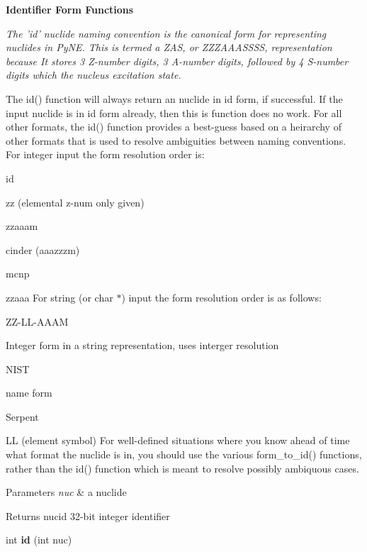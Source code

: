 \begin{Indent}{\bf Identifier Form Functions}\par
{\em The 'id' nuclide naming convention is the canonical form for representing nuclides in Py\+N\+E. This is termed a Z\+A\+S, or Z\+Z\+Z\+A\+A\+A\+S\+S\+S\+S, representation because It stores 3 Z-\/number digits, 3 A-\/number digits, followed by 4 S-\/number digits which the nucleus excitation state.

The id() function will always return an nuclide in id form, if successful. If the input nuclide is in id form already, then this is function does no work. For all other formats, the id() function provides a best-\/guess based on a heirarchy of other formats that is used to resolve ambiguities between naming conventions. For integer input the form resolution order is\+:
\begin{DoxyItemize}
\item id
\item zz (elemental z-\/num only given)
\item zzaaam
\item cinder (aaazzzm)
\item mcnp
\item zzaaa For string (or char $\ast$) input the form resolution order is as follows\+:
\item Z\+Z-\/\+L\+L-\/\+A\+A\+A\+M
\item Integer form in a string representation, uses interger resolution
\item N\+I\+S\+T
\item name form
\item Serpent
\item L\+L (element symbol) For well-\/defined situations where you know ahead of time what format the nuclide is in, you should use the various form\+\_\+to\+\_\+id() functions, rather than the id() function which is meant to resolve possibly ambiquous cases. 
\begin{DoxyParams}{Parameters}
{\em nuc} & a nuclide \\
\hline
\end{DoxyParams}
\begin{DoxyReturn}{Returns}
nucid 32-\/bit integer identifier 
\end{DoxyReturn}

\end{DoxyItemize}}\begin{DoxyCompactItemize}
\item 
\hypertarget{namespacepyne_1_1nucname_a179fb56293a25041720035d6ca7a56c5}{int {\bfseries id} (int nuc)}\label{namespacepyne_1_1nucname_a179fb56293a25041720035d6ca7a56c5}


\end{DoxyCompactItemize}
\end{Indent}
